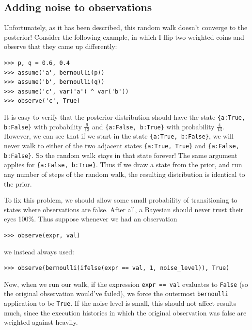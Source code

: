 \documentclass[11pt]{article}
\begin{document}
\subsection{Adding noise to observations}

Unfortunately, as it has been described, this random walk doesn't converge to the posterior!  Consider the following example, in which I flip two weighted coins and observe that they came up differently:  

\begin{small}
\begin{verbatim}
>>> p, q = 0.6, 0.4
>>> assume('a', bernoulli(p))
>>> assume('b', bernoulli(q))
>>> assume('c', var('a') ^ var('b'))
>>> observe('c', True)
\end{verbatim}
\end{small}

It is easy to verify that the posterior distribution should have the state {\tt \{a:True, b:False\}} with probability $\frac{9}{13}$ and {\tt \{a:False, b:True\}} with probability $\frac{4}{13}$.  However, we can see that if we start in the state {\tt \{a:True, b:False\}}, we will never walk to either of the two adjacent states {\tt \{a:True, True\}} and {\tt \{a:False, b:False\}}.  So the random walk stays in that state forever!  The same argument applies for {\tt \{a:False, b:True\}}.  Thus if we draw a state from the prior, and run any number of steps of the random walk, the resulting distribution is identical to the prior.  \vspace{6 pt}

To fix this problem, we should allow some small probability of transitioning to states where observations are false.  After all, a Bayesian should never trust their eyes 100\%.  Thus suppose whenever we had an observation

\begin{small}
\begin{verbatim}
>>> observe(expr, val)
\end{verbatim}
\end{small}

we instead always used:

\begin{small}
\begin{verbatim}
>>> observe(bernoulli(ifelse(expr == val, 1, noise_level)), True)
\end{verbatim}
\end{small}

Now, when we run our walk, if the expression {\tt expr == val} evaluates to {\tt False} (so the original observation would've failed), we force the outermost {\tt bernoulli} application to be {\tt True}.   If the noise level is small, this should not affect results much, since the execution histories in which the original observation was false are weighted against heavily.  
\end{document}
